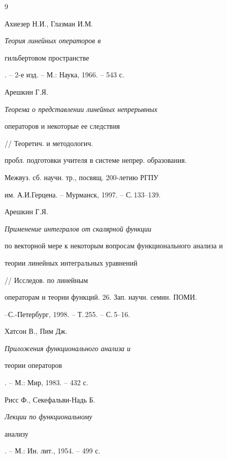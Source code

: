 \begin{thebibliography}{9} 


 




Ахиезер Н.И., Глазман И.М. {\em Теория линейных операторов в 


гильбертовом пространстве}. -- 2-е изд. -- М.: Наука, 1966. -- 543 с. 




Арешкин Г.Я. {\em Теорема о представлении линейных непрерывных 


операторов и некоторые ее следствия} // Теоретич. и методологич.


пробл. подготовки учителя в системе непрер. образования. 


Межвуз. сб. научн. тр., посвящ. 200-летию РГПУ 


им. А.И.Герцена. -- Мурманск, 1997. -- С.\,133--139. 




Арешкин Г.Я. {\em Применение интегралов от скалярной функции 


по векторной мере к некоторым вопросам функционального анализа и 


теории линейных интегральных уравнений} // Исследов. по линейным 


операторам и теории функций. 26. Зап. научн. семин. ПОМИ. 


--\linebreak С.-Петербург, 1998. -- Т.\,255. -- С.\,5--16. 




Хатсон В., Пим Дж. {\em Приложения функционального анализа и 


теории операторов}. -- М.: Мир, 1983. -- 432 с. 




Рисс Ф., Секефальви-Надь Б. {\em Лекции по функциональному 


анализу}. -- М.: Ин. лит., 1954. -- 499 с. 


 


\end{thebibliography} 


 


\vskip 2cm 


 









\label{end} 


 



